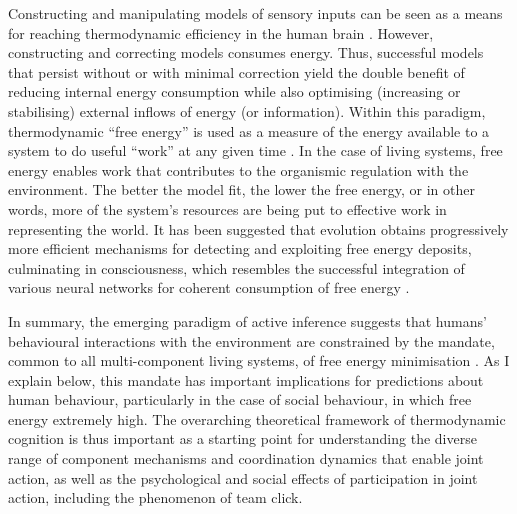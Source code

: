 \begin{CJK}{UTF8}{gbsn}
Constructing and manipulating models of sensory inputs can be seen as a means for reaching thermodynamic efficiency in the human brain \citep{Yufik2013}. However, constructing and correcting models consumes energy.  Thus, successful models that persist without or with minimal correction yield the double benefit of reducing internal energy consumption while also optimising (increasing or stabilising) external inflows of energy (or information).  Within this paradigm, thermodynamic ``free energy'' is used as a measure of the energy available to a system to do useful ``work'' at any given time \citep[and entropy is the long-term average of free energy, see][]{Stoner2000,Friston2013}.  In the case of living systems, free energy enables work that contributes to the organismic regulation with the environment. The better the model fit, the lower the free energy, or in other words, more of the system's resources are being put to effective work in representing the world.  It has been suggested that evolution obtains progressively more efficient mechanisms for detecting and exploiting free energy deposits, culminating in consciousness, which resembles the successful integration of various neural networks for coherent consumption of free energy \citep{Annila2016}.

In summary, the emerging paradigm of active inference suggests that humans' behavioural interactions with the environment are constrained by the mandate, common to all multi-component living systems, of free energy minimisation \citep{Friston2013}.  As I explain below, this mandate has important implications for predictions about human behaviour, particularly in the case of social behaviour, in which free energy extremely high.  The overarching theoretical framework of thermodynamic cognition is thus important as a starting point for understanding the diverse range of component mechanisms and coordination dynamics that enable joint action, as well as the psychological and social effects of participation in joint action, including the phenomenon of team click.



\end{CJK}
